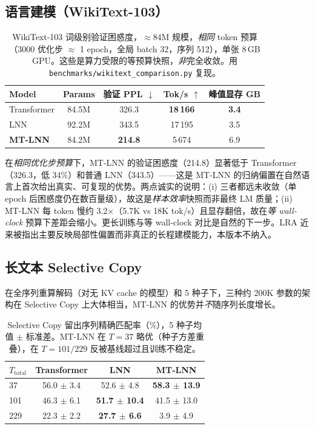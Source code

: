 \documentclass[11pt]{article}
\theoremstyle{definition}
\begin{document}
\subsection{语言建模（WikiText-103）}

\begin{table}[h]
\centering
\caption{WikiText-103 词级别验证困惑度，$\approx$84M 规模，\emph{相同} token 预算（3000 优化步 $\approx$ 1 epoch，全局 batch 32，序列 512），单张 8\,GB GPU。这些是算力受限的等预算快照，\emph{非}完全收敛。用 \texttt{benchmarks/wikitext\_comparison.py} 复现。}
\label{tab:wt103}
\begin{tabular}{lcccc}
\toprule
Model & Params & 验证 PPL $\downarrow$ & Tok/s $\uparrow$ & 峰值显存 GB \\
\midrule
Transformer & 84.5M & 326.3 & \textbf{18\,166} & \textbf{3.4} \\
LNN & 92.2M & 343.5 & 17\,195 & 3.5 \\
\textbf{MT-LNN} & 84.2M & \textbf{214.8} & 5\,674 & 6.9 \\
\bottomrule
\end{tabular}
\end{table}

在\emph{相同优化步预算}下，MT-LNN 的验证困惑度（214.8）显著低于 Transformer（326.3，低 34\%）和普通 LNN（343.5）——这是 MT-LNN 的归纳偏置在自然语言上首次给出真实、可复现的优势。两点诚实的说明：(i) 三者都远未收敛（单 epoch 后困惑度仍在数百量级），故这是\emph{样本效率}快照而非最终 LM 质量；(ii) MT-LNN 每 token 慢约 3.2$\times$（5.7K vs 18K tok/s）且显存翻倍，故在\emph{等 wall-clock} 预算下差距会缩小。更长训练与等 wall-clock 对比是自然的下一步。LRA 近来被指出主要反映局部性偏置而非真正的长程建模能力，本版本不纳入。

\subsection{长文本 Selective Copy}
在全序列重算解码（对无 KV cache 的模型）和 5 种子下，三种约 200K 参数的架构在 Selective Copy 上大体相当，MT-LNN 的优势并\emph{不}随序列长度增长。

\begin{table}[h]
\centering
\caption{Selective Copy 留出序列精确匹配率（\%），5 种子均值 $\pm$ 标准差。MT-LNN 在 $T=37$ 略优（种子方差重叠），在 $T=101/229$ 反被基线超过且训练不稳定。}
\label{tab:long_ctx}
\begin{tabular}{lccc}
\toprule
$T_\text{total}$ & Transformer & LNN & MT-LNN \\
\midrule
37  & 56.0 $\pm$ 3.4 & 52.6 $\pm$ 4.8 & \textbf{58.3 $\pm$ 13.9} \\
101 & 46.3 $\pm$ 6.1 & \textbf{51.7 $\pm$ 10.4} & 41.5 $\pm$ 13.0 \\
229 & 22.3 $\pm$ 2.2 & \textbf{27.7 $\pm$ 6.6} &  3.9 $\pm$ 4.9 \\
\bottomrule
\end{tabular}
\end{table}
\end{document}
